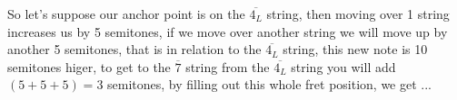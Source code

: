 \documentclass[preview]{standalone}
\begin{document}
\begin{center}
So let's suppose our anchor point is on the $\overline{4_L}$ string, then moving over 1 string increases us by 5 semitones, if we move over another string we will move up by another 5 semitones, that is in relation to the $\overline{4_L}$ string, this new note is 10 semitones higer, to get to the $\overline{7}$ string from the $\overline{4_L}$ string you will add $(5 + 5 + 5) = 3$ semitones, by filling out this whole fret position, we get ...
\end{center}
\end{document}
